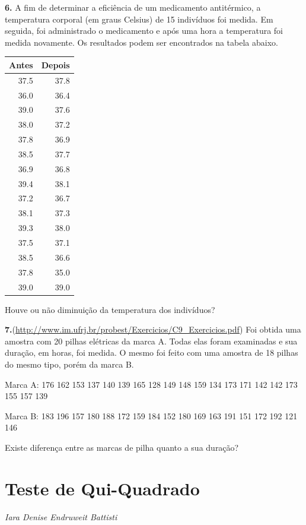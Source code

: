 \documentclass[12pt,brazil,oneside]{book}
\begin{document}
\textbf{6.} A fim de determinar a eficiência de um medicamento antitérmico, a temperatura corporal (em graus Celsius) de 15 indivíduos foi medida. Em seguida, foi administrado o medicamento e após uma hora a temperatura foi medida novamente. Os resultados podem ser encontrados na tabela abaixo.

\begin{tabular}{r|r}
\hline
Antes & Depois\\
\hline
37.5 & 37.8\\
\hline
36.0 & 36.4\\
\hline
39.0 & 37.6\\
\hline
38.0 & 37.2\\
\hline
37.8 & 36.9\\
\hline
38.5 & 37.7\\
\hline
36.9 & 36.8\\
\hline
39.4 & 38.1\\
\hline
37.2 & 36.7\\
\hline
38.1 & 37.3\\
\hline
39.3 & 38.0\\
\hline
37.5 & 37.1\\
\hline
38.5 & 36.6\\
\hline
37.8 & 35.0\\
\hline
39.0 & 39.0\\
\hline
\end{tabular}

Houve ou não diminuição da temperatura dos indivíduos?

\textbf{7.}(\url{http://www.im.ufrj.br/probest/Exercicios/C9_Exercicios.pdf}) Foi obtida uma amostra com 20 pilhas elétricas da marca A. Todas elas foram examinadas e sua duração, em horas, foi medida. O mesmo foi feito com uma amostra de 18 pilhas do mesmo tipo, porém da marca B.

Marca A: 176 162 153 137 140 139 165 128 149 148 159 134 173 171 142 142 173 155 157 139

Marca B: 183 196 157 180 188 172 159 184 152 180 169 163 191 151 172 192 121 146

Existe diferença entre as marcas de pilha quanto a sua duração?

\hypertarget{qui}{%
\chapter{Teste de Qui-Quadrado}\label{qui}}

\emph{Iara Denise Endruweit Battisti}

\begin{flushright}
\emph{}
\end{flushright}
\end{document}
